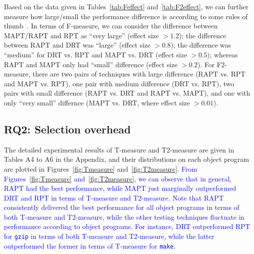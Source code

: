 \documentclass[10pt,journal,compsoc]{IEEEtran}
\begin{document}
Based on the data given in Tables~\ref{tab:Feffect} and~\ref{tab:F2effect}, we can further measure how large/small the performance difference is according to some rules of thumb~\cite{Sawilowsky09}. In terms of F-measure, we can consider the difference between MAPT/RAPT and RPT as ``very large'' (effect size $>1.2$); the difference between RAPT and DRT was ``large'' (effect size $>0.8$); the difference was ``medium'' for DRT vs. RPT and MAPT vs. DRT (effect size $>0.5$); whereas RAPT and MAPT only had ``small'' difference (effect size $>0.2$). For F2-measure, there are two pairs of techniques with large difference (RAPT vs. RPT and MAPT vs. RPT), one pair with medium difference (DRT vs. RPT), two pairs with small difference (RAPT vs. DRT and RAPT vs. MAPT), and one with only ``very small'' differnce (MAPT vs. DRT, where effect size $>0.01$).

\subsection{RQ2: Selection overhead}

The detailed experimental results of T-measure and T2-measure are given in Tables A4 to A6 in the Appendix, and their distributions on each object program are plotted in Figures~\ref{fig:Tmeasure} and~\ref{fig:T2measure}. \textcolor{blue}{From Figures~\ref{fig:Tmeasure} and~\ref{fig:T2measure}, we can observe that in general, RAPT had the best performance, while MAPT just marginally outperformed DRT and RPT in terms of T-measure and T2-measure. Note that RAPT consistently delivered the best performance for all object programs in terms of both T-measure and T2-measure, while the other testing techniques fluctuate in performance according to object programs. For instance, DRT outperformed RPT for \texttt{gzip} in terms of both T-measure and T2-measure, while the latter outperformed the former in terms of T-measure for \texttt{make}.}
\end{document}
